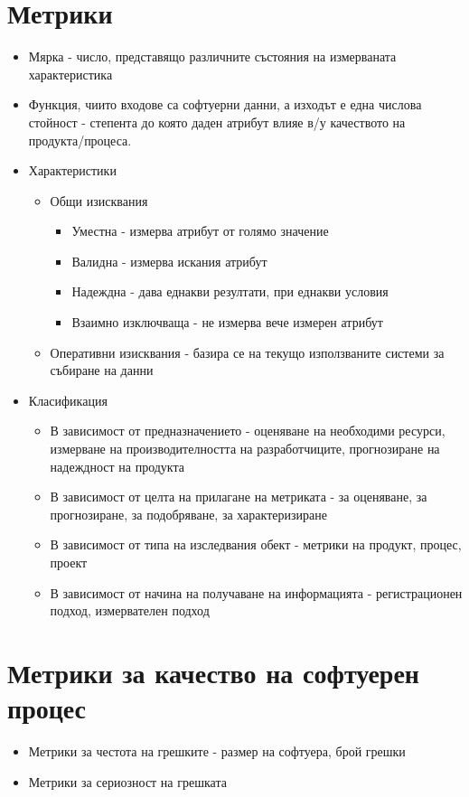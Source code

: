 \documentclass[fleqn,12pt]{article}
\begin{document}
\begin{flushleft}
\section{Метрики}
    \begin{itemize}
        \item Мярка - число, представящо различните състояния на измерваната характеристика
        \item Функция, чиито входове са софтуерни данни, а изходът е една числова стойност - степента до която даден атрибут влияе в/у качеството на продукта/процеса.
        \item Характеристики
            \begin{itemize}
                \item Общи изисквания
                    \begin{itemize}
                        \item Уместна - измерва атрибут от голямо значение
                      \item Валидна - измерва искания атрибут
                        \item Надеждна - дава еднакви резултати, при еднакви условия
                        \item Взаимно изключваща - не измерва вече измерен атрибут
                   \end{itemize}
                 \item Оперативни изисквания - базира се на текущо използваните системи за събиране на данни
            \end{itemize}
        \item Класификация
            \begin{itemize}
                \item В зависимост от предназначението - оценяване на необходими ресурси, измерване на производителността на разработчиците, прогнозиране на надеждност на продукта
                \item В зависимост от целта на прилагане на метриката - за оценяване, за прогнозиране, за подобряване, за характеризиране
                \item В зависимост от типа на изследвания обект - метрики на продукт, процес, проект
                \item В зависимост от начина на получаване на информацията - регистрационен подход, измервателен подход
            \end{itemize}
    \end{itemize}
\section{Метрики за качество на софтуерен процес}
    \begin{itemize}
        \item Метрики за честота на грешките - размер на софтуера, брой грешки 
        \item Метрики за сериозност на грешката
    \end{itemize}

\end{flushleft}
\end{document}
